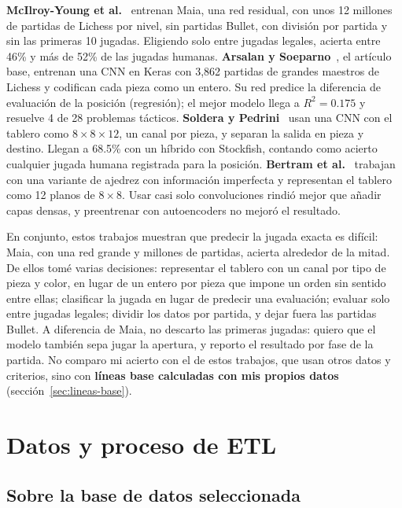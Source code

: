 \documentclass[a4paper,12pt,twocolumn]{article}
\begin{document}
\textbf{McIlroy-Young et al.}~\cite{mcilroyyoung2020} entrenan Maia, una red residual, con unos 12 millones de partidas de Lichess por nivel, sin partidas Bullet, con división por partida y sin las primeras 10 jugadas. Eligiendo solo entre jugadas legales, acierta entre 46\% y más de 52\% de las jugadas humanas.
\newline
\textbf{Arsalan y Soeparno}~\cite{arsalan2024}, el artículo base, entrenan una CNN en Keras con 3,862 partidas de grandes maestros de Lichess y codifican cada pieza como un entero. Su red predice la diferencia de evaluación de la posición (regresión); el mejor modelo llega a $R^2 = 0.175$ y resuelve 4 de 28 problemas tácticos.
\newline
\textbf{Soldera y Pedrini}~\cite{soldera2026} usan una CNN con el tablero como $8\times8\times12$, un canal por pieza, y separan la salida en pieza y destino. Llegan a 68.5\% con un híbrido con Stockfish, contando como acierto cualquier jugada humana registrada para la posición.
\newline
\textbf{Bertram et al.}~\cite{bertram2024} trabajan con una variante de ajedrez con información imperfecta y representan el tablero como 12 planos de $8\times8$. Usar casi solo convoluciones rindió mejor que añadir capas densas, y preentrenar con autoencoders no mejoró el resultado.

En conjunto, estos trabajos muestran que predecir la jugada exacta es difícil: Maia, con una red grande y millones de partidas, acierta alrededor de la mitad. De ellos tomé varias decisiones: representar el tablero con un canal por tipo de pieza y color, en lugar de un entero por pieza que impone un orden sin sentido entre ellas; clasificar la jugada en lugar de predecir una evaluación; evaluar solo entre jugadas legales; dividir los datos por partida, y dejar fuera las partidas Bullet. A diferencia de Maia, no descarto las primeras jugadas: quiero que el modelo también sepa jugar la apertura, y reporto el resultado por fase de la partida. No comparo mi acierto con el de estos trabajos, que usan otros datos y criterios, sino con \textbf{líneas base calculadas con mis propios datos} (sección~\ref{sec:lineas-base}).

\section{Datos y proceso de ETL}
\label{sec:etl}

\subsection{Sobre la base de datos seleccionada}
\end{document}
